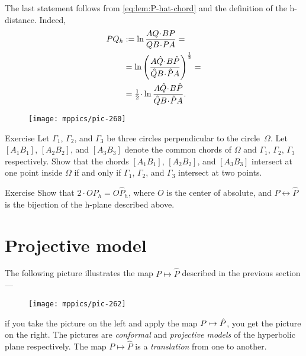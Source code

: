 The last statement follows from \ref{eq:lem:P-hat-chord} and the definition of the h-distance.
Indeed,
\begin{align*}
PQ_h&\df\ln\frac{A Q\cdot B P}{QB\cdot PA}=
\\
&=\ln\left(\frac{A \hat Q\cdot B \hat P}{\hat QB\cdot \hat PA}\right)^{\frac12}=
\\
&=\tfrac12\cdot\ln\frac{A \hat Q\cdot B \hat P}{\hat QB\cdot \hat PA}.
\end{align*}
\qedsf

{

\begin{wrapfigure}[8]{r}{36mm}
\centering
\vskip-8mm
\texttt{[image: mppics/pic-260]}
\end{wrapfigure}

\begin{thm}{Exercise}\label{ex:hex}
Let $\Gamma_1$, $\Gamma_2$, and $\Gamma_3$ 
be three circles perpendicular to the circle~$\Omega$.
Let $[A_1B_1]$, $[A_2B_2]$, and $[A_3B_3]$ denote
the common chords of $\Omega$ and $\Gamma_1$, $\Gamma_2$, $\Gamma_3$ respectively.
Show that the chords $[A_1B_1]$, $[A_2B_2]$, and $[A_3B_3]$ intersect at one point inside $\Omega$ if and only if $\Gamma_1$, $\Gamma_2$, and $\Gamma_3$ intersect at two points.
\end{thm}

\begin{thm}{Exercise}\label{ex:P<->hatP}
Show that $2\cdot OP_h=O\hat P_h$, where $O$ is the center of absolute, and $P\leftrightarrow \hat P$ is the bijection of the h-plane described above.
\end{thm}


}

\section{Projective model}
\label{sec:proj-model}

The following picture illustrates the map $P\mapsto \hat P$ described in the previous section --- 
\begin{figure}[!ht]
\centering
\texttt{[image: mppics/pic-262]}
\end{figure}
if you take the picture on the left and apply the map $P\mapsto \hat P$,
you get the picture on the right.
The pictures are {}\emph{conformal} and \emph{projective models} of the hyperbolic plane respectively.
The map $P\mapsto \hat P$ is a \textit{translation} from one to another.

